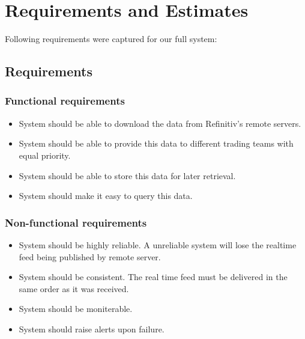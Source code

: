 
\chapter{Requirements and Estimates} %

\label{Chapter2} %



Following requirements were captured for our full system:

\section{Requirements}
\subsection{Functional requirements}
\begin{itemize}
	\item System should be able to download the data from Refinitiv's remote servers.
	\item System should be able to provide this data to different trading teams with equal priority.
	\item System should be able to store this data for later retrieval.
	\item System should make it easy to query this data.
\end{itemize}

\subsection{Non-functional requirements}
\begin{itemize}
	\item System should be highly reliable. A unreliable system will lose the realtime feed being published by remote server.
	\item System should be consistent. The real time feed must be delivered in the same order as it was received.
	\item System should be moniterable.
	\item System should raise alerts upon failure.
\end{itemize}

